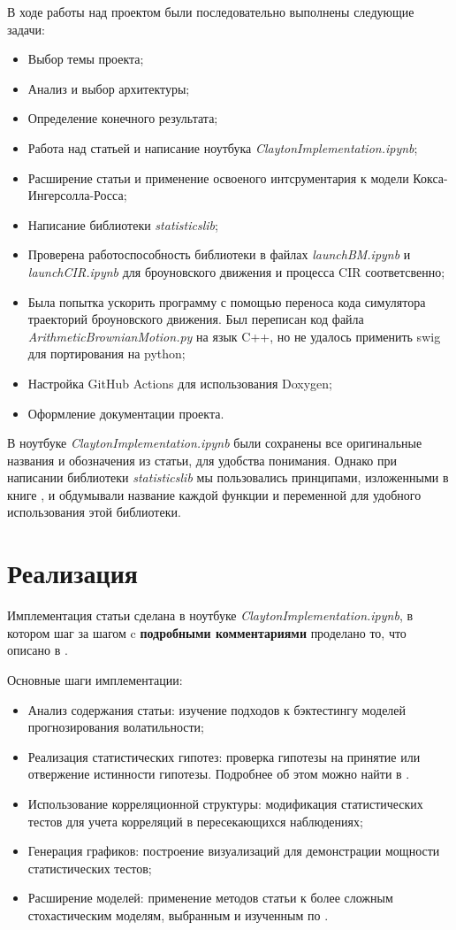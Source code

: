 \documentclass{article}
\begin{document}
В ходе работы над проектом были последовательно выполнены следующие задачи:
\begin{itemize}
    \item Выбор темы проекта;
    \item Анализ и выбор архитектуры;
    \item Определение конечного результата;
    \item Работа над статьей и написание ноутбука \textit{ClaytonImplementation.ipynb};
    \item Расширение статьи и применение освоеного интсрументария к 
    модели Кокса-Ингерсолла-Росса;
    \item Написание библиотеки \textit{statisticslib};
    \item Проверена работоспособность библиотеки в файлах \textit{launchBM.ipynb} и 
    \textit{launchCIR.ipynb} для броуновского движения и процесса CIR соответсвенно;
    \item Была попытка ускорить программу с помощью переноса кода 
    симулятора траекторий броуновского движения. Был переписан код 
    файла \textit{ArithmeticBrownianMotion.py} на язык C++, но не удалось 
    применить swig для портирования на python;
    \item Настройка GitHub Actions для использования Doxygen;
    \item Оформление документации проекта.
\end{itemize}
В ноутбуке \textit{ClaytonImplementation.ipynb} были сохранены все оригинальные 
названия и обозначения из статьи, для удобства понимания. Однако при написании 
библиотеки \textit{statisticslib} мы пользовались принципами, изложенными в 
книге \cite{RMcode}, и обдумывали название каждой функции и переменной для 
удобного использования этой библиотеки.

\section{Реализация}

Имплементация статьи сделана в ноутбуке \textit{ClaytonImplementation.ipynb}, в котором 
шаг за шагом c \textbf{подробными комментариями} проделано то, 
что описано в \cite{Cl2019}.

Основные шаги имплементации:
\begin{itemize}
    \item Анализ содержания статьи: изучение подходов к бэктестингу моделей 
    прогнозирования волатильности;
    \item Реализация статистических гипотез: проверка гипотезы на принятие 
    или отвержение истинности гипотезы. Подробнее об этом можно 
    найти в \cite{Peres2004}.
    \item Использование корреляционной структуры: модификация статистических 
    тестов для учета корреляций в пересекающихся наблюдениях;
    \item Генерация графиков: построение визуализаций для демонстрации 
    мощности статистических тестов;
    \item Расширение моделей: применение методов статьи к более сложным 
    стохастическим моделям, выбранным и изученным по \cite{Sh2005}. 
\end{itemize}   
\end{document}
